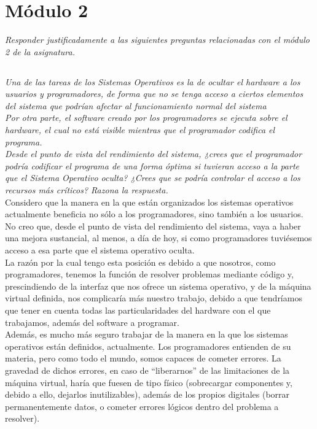 \documentclass[spanish]{article}
\begin{document}
\newpage

\section{Módulo 2}

\textit{Responder justificadamente a las siguientes
preguntas relacionadas con el módulo 2 de la asignatura.}

\subsection{}

\textit{Una de las tareas de los Sistemas Operativos es la
de ocultar el hardware a los usuarios y programadores, de
forma que no se tenga acceso a ciertos elementos del sistema
que podrían afectar al funcionamiento normal del sistema}\\

\textit{Por otra parte, el software creado por los
programadores se ejecuta sobre el hardware, el cual no está
visible mientras que el programador codifica el programa.}\\

\textit{Desde el punto de vista del rendimiento del sistema,
¿crees que el programador podría codificar el programa de
una forma óptima si tuvieran acceso a la parte que el
Sistema Operativo oculta? ¿Crees que se podría controlar el
acceso a los recursos más críticos? Razona la respuesta.}\\

Considero que la manera en la que están organizados los
sistemas operativos actualmente beneficia no sólo a los
programadores, sino también a los usuarios. No creo que,
desde el punto de vista del rendimiento del sistema, vaya a
haber una mejora sustancial, al menos, a día de hoy, si como
programadores tuviésemos acceso a esa parte que el sistema
operativo oculta.\\

La razón por la cual tengo esta posición es debido a que
nosotros, como programadores, tenemos la función de resolver
problemas mediante código y, prescindiendo de la interfaz
que nos ofrece un sistema operativo, y de la máquina virtual
definida, nos complicaría más nuestro trabajo, debido a que
tendríamos que tener en cuenta todas las particularidades
del hardware con el que trabajamos, además del software a
programar.\\

Además, es mucho más seguro trabajar de la manera en la que
los sistemas operativos están definidos, actualmente. Los
programadores entienden de su materia, pero como todo el
mundo, somos capaces de cometer errores. La gravedad de
dichos errores, en caso de ``liberarnos'' de las
limitaciones de la máquina virtual, haría que fuesen de tipo
físico (sobrecargar componentes y, debido a ello, dejarlos
inutilizables), además de los propios digitales (borrar
permanentemente datos, o cometer errores lógicos dentro del
problema a resolver).
\end{document}
